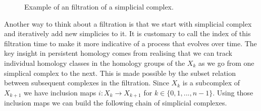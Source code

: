 \begin{figure}[h]
    \qquad
    \caption{Example of an filtration of a simplicial complex.}%
    \label{fig:example-filtration}%
\end{figure}

%

Another way to think about a filtration is that we start with simplicial complex and iteratively add new simplicies to it. It is customary to call the index of this filtration time to make it more indicative of a process that evolves over time. The key insight in persistent homology comes from realising that we can track individual homology classes in the homology groups of the $X_k$ as we go from one simplical complex to the next. This is made possible by the subset relation between subsequent complexes in the filtration. Since $X_k$ is a subcomplex of $X_{k+1}$ we have inclusion maps $i: X_{k} \to X_{k+1}$ for $k \in \{0, 1, ..., n - 1\}$. Using those inclusion maps we can build the following chain of simplicial complexes.

